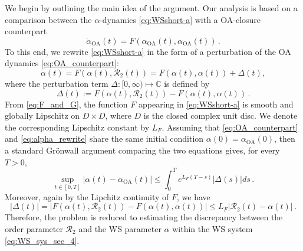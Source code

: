 \documentclass[10pt]{article}
\theoremstyle{definition}
\theoremstyle{definition}
\numberwithin{equation}{section}
\newcommand{\BBC}{\mathbb{C}}
\newcommand{\CR}{\mathcal{R}}
\newcommand{\OA}{\mathrm{OA}}
\begin{document}
We begin by outlining the main idea of the argument.
Our analysis is based on a comparison between the $\alpha$-dynamics \eqref{eq:WSshort-a} with a OA-closure counterpart
\begin{equation}\label{eq:OA_counterpart}
\dot{\alpha}_{\OA}(t)=F(\alpha_{\OA}(t),\alpha_{\OA}(t)) \, .
\end{equation}
To this end, we rewrite \eqref{eq:WSshort-a} in the form of a perturbation of the OA dynamics \eqref{eq:OA_counterpart}:
\begin{equation}\label{eq:alpha_rewrite}
\Dot{\alpha}(t) = F(\alpha(t), \CR_2(t)) = F(\alpha(t), \alpha(t)) + \Delta(t),
\end{equation}
where the perturbation term $\Delta: [0, \infty) \mapsto \BBC$ is defined by
\begin{equation}\label{eq:Delta}
    \Delta(t) := F(\alpha(t), \CR_2(t)) - F(\alpha(t), \alpha(t)) \, .
\end{equation}
From \eqref{eq:F_and_G}, the function $F$ appearing in \eqref{eq:WSshort-a} is smooth and globally Lipschitz on 
$D \times D$, where $D$ is the closed complex unit disc.
We denote the corresponding Lipschitz constant by $L_F$.
Assuming that \eqref{eq:OA_counterpart} and \eqref{eq:alpha_rewrite} share the same initial condition $\alpha(0) = \alpha_{\OA} (0)$,
then a standard Grönwall argument comparing the two equations gives, for every $T > 0$,
\begin{equation*}
\sup_{t \in [0,T]} \left| \alpha(t) - \alpha_{\OA}(t) \right| \leq \int_0^T e^{L_F(T-s)} |\Delta(s)|ds \, .
\end{equation*}
Moreover, again by the Lipchitz continuity of $F$, we have
\begin{equation}\label{eq:Delta_bound_gen}
    |\Delta(t)| = \left| F(\alpha(t), \CR_2(t)) - F(\alpha(t), \alpha(t)) \right| \leq L_F \left| \CR_2 (t) - \alpha(t) \right| \, .
\end{equation}
Therefore, the problem is reduced to estimating the discrepancy between the order parameter $\CR_2$ and the WS parameter $\alpha$ within the WS system \eqref{eq:WS_sys_sec_4}.
\end{document}
